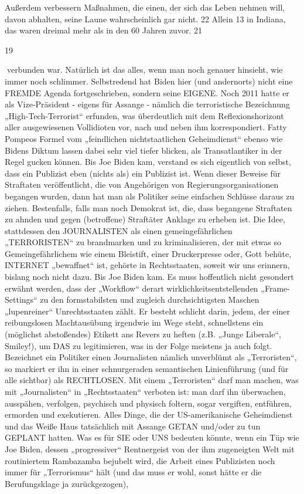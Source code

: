 \begin{multicols}{2}
Außerdem verbessern Maßnahmen, die einen, der sich das Leben nehmen will, davon abhalten, seine Laune
wahrscheinlich gar nicht.
22
Allein 13 in Indiana, das waren dreimal mehr als in den 60 Jahren zuvor.
21

19

verbunden war.
Natürlich ist das alles, wenn man noch genauer hinsieht,
wie immer noch schlimmer. Selbstredend hat Biden
hier (und andernorts) nicht eine FREMDE Agenda fortgeschrieben, sondern seine EIGENE. Noch 2011 hatte
er als Vize-Präsident - eigens für Assange - nämlich die
terroristische Bezeichnung „High-Tech-Terrorist“ erfunden, was überdeutlich mit dem Reflexionshorizont aller
ausgewiesenen Vollidioten vor, nach und neben ihm
korrespondiert.
Fatty Pompeos Formel vom „feindlichen nichtstaatlichen Geheimdienst“ ebenso wie Bidens Diktum lassen
dabei sehr viel tiefer blicken, als Transatlantiker in der
Regel gucken können. Bis Joe Biden kam, verstand es
sich eigentlich von selbst, dass ein Publizist eben (nichts
als) ein Publizist ist. Wenn dieser Beweise für Straftaten
veröffentlicht, die von Angehörigen von Regierungsorganisationen begangen wurden, dann hat man als Politiker
seine einfachen Schlüsse daraus zu ziehen. Bestenfalls,
falls man noch Demokrat ist, die, dass begangene Straftaten zu ahnden und gegen (betroffene) Straftäter Anklage zu erheben ist. Die Idee, stattdessen den JOURNALISTEN als einen gemeingefährlichen „TERRORISTEN“
zu brandmarken und zu kriminalisieren, der mit etwas
so Gemeingefährlichem wie einem Bleistift, einer Druckerpresse oder, Gott behüte, INTERNET „bewaffnet“
ist, gehörte in Rechtsstaaten, soweit wir uns erinnern,
bislang noch nicht dazu. Bis Joe Biden kam.
Es muss hoffentlich nicht gesondert erwähnt werden,
dass der „Workflow“ derart wirklichkeitsentstellenden
„Frame-Settings“ zu den formstabilsten und zugleich
durchsichtigsten Maschen „lupenreiner“ Unrechtsstaaten zählt. Er besteht schlicht darin, jedem, der einer reibungslosen Machtausübung irgendwie im Wege steht,
schnellstens ein (möglichst abstoßendes) Etikett ans Revers zu heften (z.B. „Junge Liberale“, Smiley!), um DAS
zu legitimieren, was in der Folge meistens ja auch folgt.
Bezeichnet ein Politiker einen Journalisten nämlich unverblümt als „Terroristen“, so markiert er ihn in einer
schnurgeraden semantischen Linienführung (und für
alle sichtbar) als RECHTLOSEN. Mit einem „Terroristen“
darf man machen, was mit „Journalisten“ in „Rechtsstaaten“ verboten ist: man darf ihn überwachen, ausspähen,
verfolgen, psychisch und physisch foltern, sogar vergiften, entführen, ermorden und exekutieren. Alles Dinge,
die der US-amerikanische Geheimdienst und das Weiße
Haus tatsächlich mit Assange GETAN und/oder zu tun
GEPLANT hatten.
Was es für SIE oder UNS bedeuten könnte, wenn ein
Tüp wie Joe Biden, dessen „progressiver“ Rentnergeist
von der ihm zugeneigten Welt mit routiniertem Rambazamba bejubelt wird, die Arbeit eines Publizisten noch
immer für „Terrorismus“ hält (und das muss er wohl,
sonst hätte er die Berufungsklage ja zurückgezogen),


\end{multicols}
